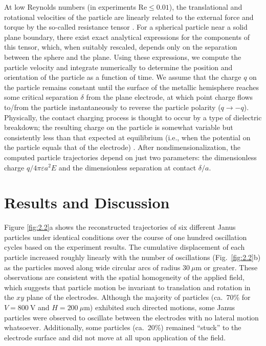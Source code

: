 At low Reynolds numbers (in experiments Re$\leq0.01$), the translational and rotational velocities of the particle are linearly related to the external force and torque by the so-called resistance tensor \autocite{Kim2005, Swan2007}.
For a spherical particle near a solid plane boundary, there exist exact analytical expressions \autocite{Kim2005} for the components of this tensor, which, when suitably rescaled, depends only on the separation between the sphere and the plane. 
Using these expressions, we compute the particle velocity and integrate numerically to determine the position and orientation of the particle as a function of time.
We assume that the charge $q$ on the particle remains constant until the surface of the metallic hemisphere reaches some critical separation $\delta$ from the plane electrode, at which point charge flows to/from the particle instantaneously to reverse the particle polarity ($q\rightarrow -q$).
Physically, the contact charging process is thought to occur by a type of dielectric breakdown; the resulting charge on the particle is somewhat variable but consistently less than that expected at equilibrium (i.e., when the potential on the particle equals that of the electrode) \autocite{drews2015contact}.
After nondimensionalization, the computed particle trajectories depend on just two parameters: the dimensionless charge $q / 4\pi\varepsilon a^2 E$ and the dimensionless separation at contact $\delta / a$.


\section{Results and Discussion}

Figure \ref{fig:2.2}a shows the reconstructed trajectories of six different Janus particles under identical conditions over the course of one hundred oscillation cycles based on the experiment results. 
The cumulative displacement of each particle increased roughly linearly with the number of oscillations (Fig.~\ref{fig:2.2}b) as the particles moved along wide circular arcs of radius $30~\mu\text{m}$ or greater.
These observations are consistent with the spatial homogeneity of the applied field, which suggests that particle motion be invariant to translation and rotation in the $xy$ plane of the electrodes.
Although the majority of particles (ca.~70\% for $V=800~\text{V}$ and $H=200~\mu\text{m}$) exhibited such directed motions, some Janus particles were observed to oscillate between the electrodes with no lateral motion whatsoever.
Additionally, some particles (ca.~20\%) remained ``stuck'' to the electrode surface and did not move at all upon application of the field.

